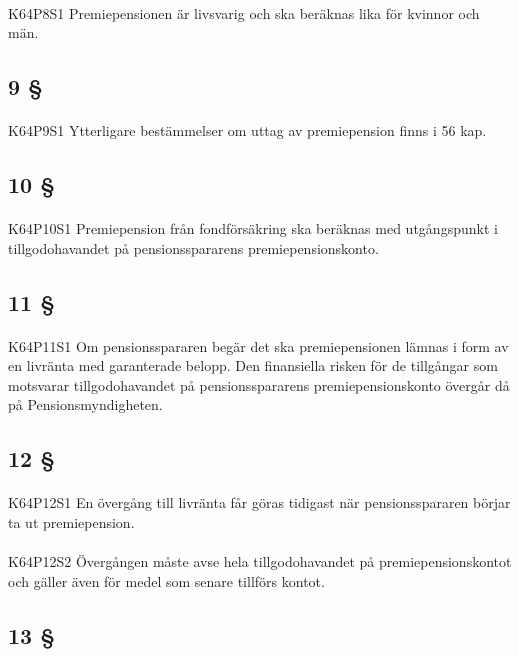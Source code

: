 \documentclass[a4paper,notitlepage,openany,10pt]{book}
\begin{document}
\paragraph*{}
{\tiny K64P8S1}
Premiepensionen är livsvarig och ska beräknas lika för kvinnor och män.
\subsection*{9 §}
\paragraph*{}
{\tiny K64P9S1}
Ytterligare bestämmelser om uttag av premiepension finns i 56 kap.
\subsection*{10 §}
\paragraph*{}
{\tiny K64P10S1}
Premiepension från fondförsäkring ska beräknas med utgångspunkt i tillgodohavandet på pensionsspararens premiepensionskonto.
\subsection*{11 §}
\paragraph*{}
{\tiny K64P11S1}
Om pensionsspararen begär det ska premiepensionen lämnas i form av en livränta med garanterade belopp. Den finansiella risken för de tillgångar som motsvarar tillgodohavandet på pensionsspararens premiepensionskonto övergår då på Pensionsmyndigheten.
\subsection*{12 §}
\paragraph*{}
{\tiny K64P12S1}
En övergång till livränta får göras tidigast när pensionsspararen börjar ta ut premiepension.
\paragraph*{}
{\tiny K64P12S2}
Övergången måste avse hela tillgodohavandet på premiepensionskontot och gäller även för medel som senare tillförs kontot.
\subsection*{13 §}
\end{document}
